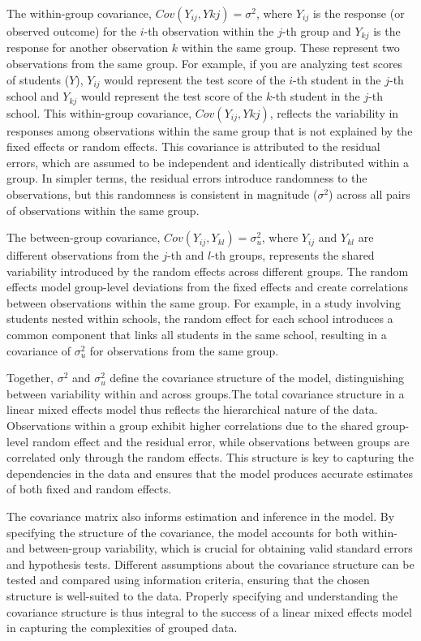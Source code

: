 The within-group covariance, $Cov(Y_{ij},Y{kj})=\sigma^2$, where $Y_{ij}$ is the response (or observed outcome) for the $i$-th observation within the $j$-th group and $Y_{kj}$ is the response for another observation $k$ within the same group. These represent two observations from the same group. For example, if you are analyzing test scores of students ($Y$), $Y_{ij}$ would represent the test score of the $i$-th student in the $j$-th school and $Y_{kj}$ would represent the test score of the $k$-th student in the $j$-th school. This within-group covariance, $Cov(Y_{ij},Y{kj})$, reflects the variability in responses among observations within the same group that is not explained by the fixed effects or random effects. This covariance is attributed to the residual errors, which are assumed to be independent and identically distributed within a group. In simpler terms, the residual errors introduce randomness to the observations, but this randomness is consistent in magnitude ($\sigma^2$) across all pairs of observations within the same group.

The between-group covariance, $Cov(Y_{ij},Y_{kl})=\sigma_u^2$, where $Y_{ij}$ and $Y_{kl}$ are different observations from the $j$-th and $l$-th groups, represents the shared variability introduced by the random effects across different groups. The random effects model group-level deviations from the fixed effects and create correlations between observations within the same group. For example, in a study involving students nested within schools, the random effect for each school introduces a common component that links all students in the same school, resulting in a covariance of $\sigma_u^2$ for observations from the same group.

Together, $\sigma^2$ and $\sigma_u^2$ define the covariance structure of the model, distinguishing between variability within and across groups.The total covariance structure in a linear mixed effects model thus reflects the hierarchical nature of the data. Observations within a group exhibit higher correlations due to the shared group-level random effect and the residual error, while observations between groups are correlated only through the random effects. This structure is key to capturing the dependencies in the data and ensures that the model produces accurate estimates of both fixed and random effects.

The covariance matrix also informs estimation and inference in the model. By specifying the structure of the covariance, the model accounts for both within- and between-group variability, which is crucial for obtaining valid standard errors and hypothesis tests. Different assumptions about the covariance structure can be tested and compared using information criteria, ensuring that the chosen structure is well-suited to the data. Properly specifying and understanding the covariance structure is thus integral to the success of a linear mixed effects model in capturing the complexities of grouped data.

